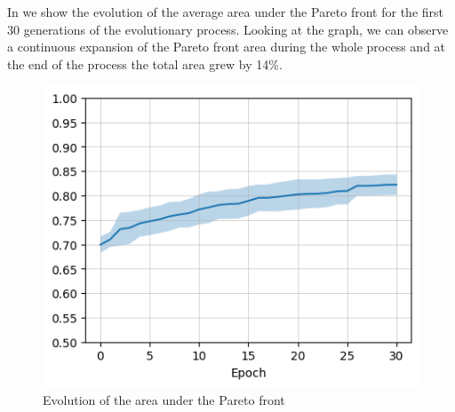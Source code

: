 In  we show the evolution of the average area under the Pareto front for the first 30 generations of the evolutionary process. 
Looking at the graph, we can observe a continuous expansion of the Pareto front area during the whole process and at the end of the process the total area grew by 14\%.

\begin{figure}[hbtp]
\centering
\includegraphics[width=0.6\linewidth]{Images/images/experiment_two/Pareto/pareto_evolution_avg.png}
\caption{Evolution of the area under the Pareto front}
\label{fig:ex_two_pareto_area}
\end{figure}

